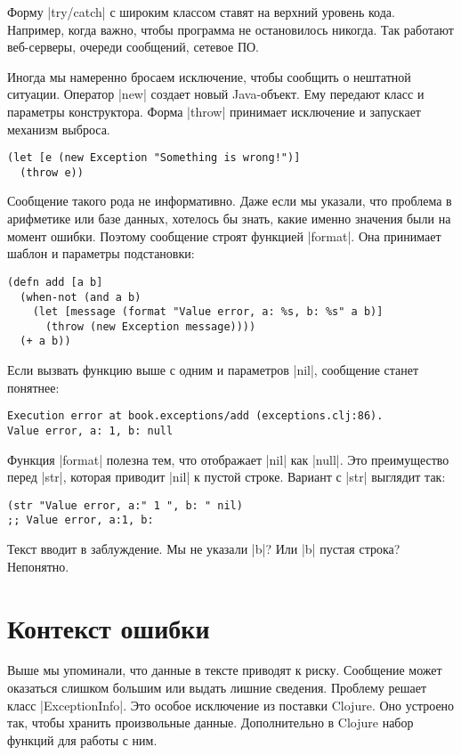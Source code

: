 Форму \spverb|try/catch| с широким классом ставят на верхний уровень
кода. Например, когда важно, чтобы программа не остановилось никогда. Так
работают веб-серверы, очереди сообщений, сетевое ПО.

Иногда мы намеренно бросаем исключение, чтобы сообщить о нештатной
ситуации. Оператор \spverb|new| создает новый Java-объект. Ему передают класс и
параметры конструктора. Форма \spverb|throw| принимает исключение и запускает
механизм выброса.

\begin{verbatim}
(let [e (new Exception "Something is wrong!")]
  (throw e))
\end{verbatim}

Сообщение такого рода не информативно. Даже если мы указали, что проблема в
арифметике или базе данных, хотелось бы знать, какие именно значения были на
момент ошибки. Поэтому сообщение строят функцией \spverb|format|. Она принимает
шаблон и параметры подстановки:

\begin{verbatim}
(defn add [a b]
  (when-not (and a b)
    (let [message (format "Value error, a: %s, b: %s" a b)]
      (throw (new Exception message))))
  (+ a b))
\end{verbatim}

\noindent
Если вызвать функцию выше с одним и параметров \spverb|nil|, сообщение станет
понятнее:

\begin{verbatim}
Execution error at book.exceptions/add (exceptions.clj:86).
Value error, a: 1, b: null
\end{verbatim}

Функция \spverb|format| полезна тем, что отображает \spverb|nil| как
\spverb|null|. Это преимущество перед \spverb|str|, которая приводит
\spverb|nil| к пустой строке. Вариант с \spverb|str| выглядит так:

\begin{verbatim}
(str "Value error, a:" 1 ", b: " nil)
;; Value error, a:1, b:
\end{verbatim}

\noindent
Текст вводит в заблуждение. Мы не указали \spverb|b|? Или \spverb|b| пустая
строка? Непонятно.

\section{Контекст ошибки}

Выше мы упоминали, что данные в тексте приводят к риску. Сообщение может
оказаться слишком большим или выдать лишние сведения. Проблему решает класс
\spverb|ExceptionInfo|. Это особое исключение из поставки Clojure. Оно устроено
так, чтобы хранить произвольные данные. Дополнительно в Clojure набор функций
для работы с ним.

